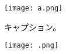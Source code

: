 \documentclass[dvipdfmx,uplatex]{jsarticle}
\title{}
\author{}
\begin{document}
\maketitle
\setcounter{tocdepth}{3}
\tableofcontents
\listoffigures
\listoftables



\begin{wrapfigure}{l}[10pt]{0.5\textwidth}
  \centering
 \texttt{[image: a.png]}
 \caption{キャプション。}
\end{wrapfigure}


\begin{figure}[h]
    \begin{center}
    \texttt{[image: .png]}
    \caption{}
    \label{fig:}
    \end{center}
\end{figure}
\end{document}

